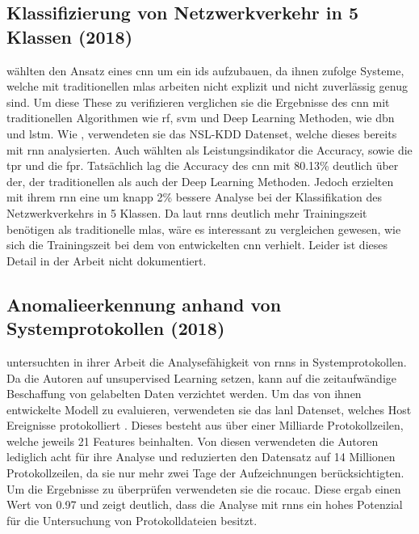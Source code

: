 \documentclass[
    12pt, %
    DIV10,
    ngerman, %
    a4paper, %
    oneside, %
    titlepage, %
    parskip=half, %
    headings=normal, %
    listof=totoc, %
    bibliography=totoc, %
    index=totoc, %
    captions=tableheading, %
    final %
]{scrreprt}
\begin{document}
\subsection{Klassifizierung von Netzwerkverkehr in 5 Klassen (2018)}\label{ding}
\textcite{Ding2018} wählten den Ansatz eines \ac{cnn} um ein \ac{ids} aufzubauen, da ihnen zufolge Systeme, welche mit traditionellen \ac{mlas} arbeiten nicht explizit und nicht zuverlässig genug sind. Um diese These zu verifizieren verglichen sie die Ergebnisse des \ac{cnn} mit traditionellen Algorithmen wie \ac{rf}, \ac{svm} und Deep Learning Methoden, wie \ac{dbn} und \ac{lstm}. Wie \textcite{Yin2017}, verwendeten sie das NSL-KDD Datenset, welche dieses bereits mit \ac{rnn} analysierten. Auch \textcite{Ding2018} wählten als Leistungsindikator die Accuracy, sowie die \ac{tpr} und die \ac{fpr}. Tatsächlich lag die Accuracy des \ac{cnn} mit 80.13\% deutlich über der, der traditionellen als auch der Deep Learning Methoden. Jedoch erzielten \textcite{Yin2017} mit ihrem \ac{rnn} eine um knapp 2\% bessere Analyse bei der Klassifikation des Netzwerkverkehrs in 5 Klassen. Da laut \textcite{Yin2017} \ac{rnns} deutlich mehr Trainingszeit benötigen als traditionelle \ac{mlas}, wäre es interessant zu vergleichen gewesen, wie sich die Trainingszeit bei dem von \textcite{Ding2018} entwickelten \ac{cnn} verhielt. Leider ist dieses Detail in der Arbeit nicht dokumentiert.
%
\subsection{Anomalieerkennung anhand von Systemprotokollen (2018)}\label{brown}
\textcite{Brown2018} untersuchten in ihrer Arbeit die Analysefähigkeit von \ac{rnns} in Systemprotokollen. Da die Autoren auf unsupervised Learning setzen, kann auf die zeitaufwändige Beschaffung von gelabelten Daten verzichtet werden. Um das von ihnen entwickelte Modell zu evaluieren, verwendeten sie das \ac{lanl} Datenset, welches Host Ereignisse protokolliert \parencite{akent-2015-enterprise-data}. Dieses besteht aus über einer Milliarde Protokollzeilen, welche jeweils 21 Features beinhalten. Von diesen verwendeten die Autoren lediglich acht für ihre Analyse und reduzierten den Datensatz auf 14 Millionen Protokollzeilen, da sie nur mehr zwei Tage der Aufzeichnungen berücksichtigten. Um die Ergebnisse zu überprüfen verwendeten sie die \ac{rocauc}. Diese ergab einen Wert von 0.97 und zeigt deutlich, dass die Analyse mit \ac{rnns} ein hohes Potenzial für die Untersuchung von Protokolldateien besitzt.
%
\end{document}
